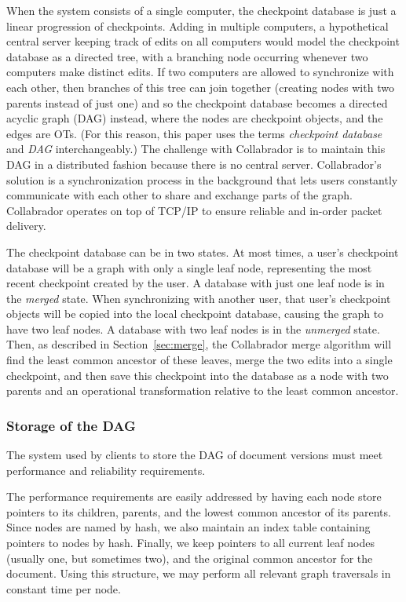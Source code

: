 \documentclass[11pt,titlepage]{article}
\begin{document}
When the system consists of a single computer, the checkpoint database
is just a linear progression of checkpoints. Adding in multiple
computers, a hypothetical central server keeping track of edits on all
computers would model the checkpoint database as a directed tree, with
a branching node occurring whenever two computers make distinct
edits. If two computers are allowed to synchronize with each other,
then branches of this tree can join together (creating nodes with two
parents instead of just one) and so the checkpoint database becomes a
directed acyclic graph (DAG) instead, where the nodes are checkpoint
objects, and the edges are OTs.  (For this reason, this paper uses the
terms \emph{checkpoint database} and \emph{DAG} interchangeably.)  The
challenge with Collabrador is to maintain this DAG in a distributed
fashion because there is no central server. Collabrador's solution
is %
a synchronization process in the background that lets users constantly
communicate with each other to share and exchange parts of the
graph. Collabrador operates on top of TCP/IP to ensure reliable and
in-order packet delivery.

The checkpoint database can be in two states. At most times, a user's
checkpoint database will be a graph with only a single leaf node,
representing the most recent checkpoint created by the user.  A
database with just one leaf node is in the \emph{merged} state. When
synchronizing with another user, that user's checkpoint objects will
be copied into the local checkpoint database, causing the graph to
have two leaf nodes. A database with two leaf nodes is in the
\emph{unmerged} state. Then, as described in Section~\ref{sec:merge},
the Collabrador merge algorithm will find the least common ancestor of
these leaves, merge the two edits into a single checkpoint, and then
save this checkpoint into the database as a node with two parents and
an operational transformation relative to the least common ancestor.

\subsubsection{Storage of the DAG}
\label{sec:storage-dag}

The system used by clients to store the DAG of document versions must
meet performance and reliability requirements.

The performance requirements are easily addressed by having each node
store pointers to its children, parents, and the lowest common
ancestor of its parents.  Since nodes are named by hash, we also
maintain an index table containing pointers to nodes by hash.
Finally, we keep pointers to all current leaf nodes (usually one, but
sometimes two), and the original common ancestor for the document.
Using this structure, we may perform all relevant graph traversals in
constant time per node.
\end{document}
